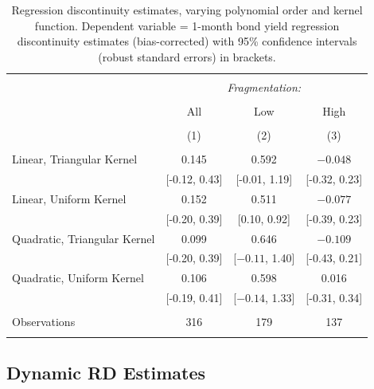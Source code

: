 \documentclass[12pt]{article}
\begin{document}
\begin{appendices}
	\begin{table}[h] \centering 
		\caption{Regression discontinuity estimates, varying polynomial order and kernel function. Dependent variable = 1-month bond yield regression discontinuity estimates (bias-corrected) with 95\% confidence intervals (robust standard errors) in brackets.} 
		\label{table:RDQuadratic} 
		\begin{tabular}{@{\extracolsep{5pt}}lccc} 
			\\[-1.8ex]\hline 
			\hline \\[-1.8ex] 
			& \multicolumn{3}{c}{\textit{Fragmentation:}} \\ 
			\cline{2-4} 
			\\[-1.8ex] & All & Low & High \\ 
			\\[-1.8ex] & (1) & (2) & (3)\\ 
			\hline \\[-1.8ex] 	
			Linear, Triangular Kernel & 0.145 & 0.592 & $-0.048$ \\ 
			& [-0.12, 0.43] & [-0.01, 1.19] & [-0.32, 0.23] \\ 
			Linear, Uniform Kernel & 0.152 & 0.511 & $-0.077$ \\ 
			& [-0.20, 0.39] & [0.10, 0.92] & [-0.39, 0.23] \\ 
			Quadratic, Triangular Kernel & 0.099 & 0.646 & $-0.109$ \\ 
			& [-0.20, 0.39] & [$-0.11$, 1.40] & [-0.43, 0.21] \\ 
			Quadratic, Uniform Kernel & 0.106 & 0.598 & 0.016 \\ 
			& [-0.19, 0.41] & [$-0.14$, 1.33] & [-0.31, 0.34] \\ 
			\hline \\[-1.8ex] 
			Observations & 316 & 179 & 137 \\ 
			\hline 
			\hline \\[-1.8ex] 
		\end{tabular} 
	\end{table}  
	
	\subsection{Dynamic RD Estimates} %


\end{appendices}
\end{document}
